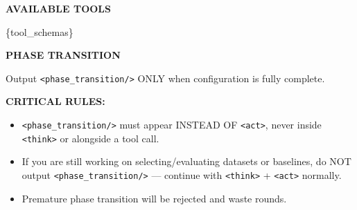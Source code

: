 \begin{tcolorbox}
\medskip
\textbf{AVAILABLE TOOLS}

\{tool\_schemas\}

\medskip
\textbf{PHASE TRANSITION}

Output \texttt{<phase\_transition/>} ONLY when configuration is fully complete.

\textbf{CRITICAL RULES:}
\begin{itemize}[nosep,leftmargin=12pt]
	\item \texttt{<phase\_transition/>} must appear INSTEAD OF \texttt{<act>}, never inside \texttt{<think>} or alongside a tool call.
	\item If you are still working on selecting/evaluating datasets or baselines, do NOT output \texttt{<phase\_transition/>} --- continue with \texttt{<think>} + \texttt{<act>} normally.
	\item Premature phase transition will be rejected and waste rounds.
\end{itemize}
\end{tcolorbox}


